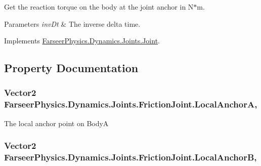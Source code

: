 Get the reaction torque on the body at the joint anchor in N$\ast$m. 


\begin{DoxyParams}{Parameters}
{\em inv\+Dt} & The inverse delta time.\\
\hline
\end{DoxyParams}


Implements \hyperlink{class_farseer_physics_1_1_dynamics_1_1_joints_1_1_joint_a21899d3bdf15c22ef4dc288ed2082cbc}{Farseer\+Physics.\+Dynamics.\+Joints.\+Joint}.



\subsection{Property Documentation}
\hypertarget{class_farseer_physics_1_1_dynamics_1_1_joints_1_1_friction_joint_a1eead46fa796aaadf6f81d545f6941b9}{
\subsubsection[{Local\+Anchor\+A}]{\setlength{\rightskip}{0pt plus 5cm}Vector2 Farseer\+Physics.\+Dynamics.\+Joints.\+Friction\+Joint.\+Local\+Anchor\+A\hspace{0.3cm}{\ttfamily [get]}, {\ttfamily [set]}}}\label{class_farseer_physics_1_1_dynamics_1_1_joints_1_1_friction_joint_a1eead46fa796aaadf6f81d545f6941b9}


The local anchor point on Body\+A 

\hypertarget{class_farseer_physics_1_1_dynamics_1_1_joints_1_1_friction_joint_ae1256a87149846475ab5e0aca0608fd9}{
\subsubsection[{Local\+Anchor\+B}]{\setlength{\rightskip}{0pt plus 5cm}Vector2 Farseer\+Physics.\+Dynamics.\+Joints.\+Friction\+Joint.\+Local\+Anchor\+B\hspace{0.3cm}{\ttfamily [get]}, {\ttfamily [set]}}}\label{class_farseer_physics_1_1_dynamics_1_1_joints_1_1_friction_joint_ae1256a87149846475ab5e0aca0608fd9}


